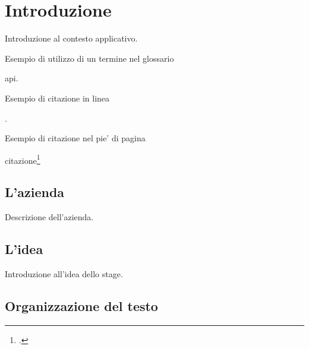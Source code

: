
\chapter{Introduzione}
\label{cap:introduzione}

Introduzione al contesto applicativo.\bigskip

\noindent Esempio di utilizzo di un termine nel glossario \par
\noindent \gls{api}.\bigskip

\noindent Esempio di citazione in linea \par
\noindent \cite{site:agile-manifesto}. \bigskip

\noindent Esempio di citazione nel pie' di pagina \par
\noindent citazione\footcite{womak:lean-thinking}

\section{L'azienda}

Descrizione dell'azienda.

\section{L'idea}

Introduzione all'idea dello stage.

\section{Organizzazione del testo}




